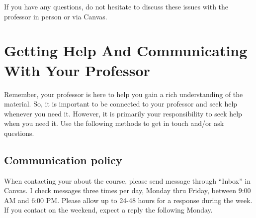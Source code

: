 \documentclass[11pt,]{article}
\begin{document}
If you have any questions, do not hesitate to discuss these issues with
the professor in person or via Canvas.

\hypertarget{getting-help-and-communicating-with-your-professor}{%
\section{Getting Help And Communicating With Your
Professor}\label{getting-help-and-communicating-with-your-professor}}

Remember, your professor is here to help you gain a rich understanding
of the material. So, it is important to be connected to your professor
and seek help whenever you need it. However, it is primarily your
responsibility to seek help when you need it. Use the following methods
to get in touch and/or ask questions.

\hypertarget{communication-policy}{%
\subsection{Communication policy}\label{communication-policy}}

When contacting your about the course, please send message through
``Inbox'' in Canvas. I check messages three times per day, Monday thru
Friday, between 9:00 AM and 6:00 PM. Please allow up to 24-48 hours for
a response during the week. If you contact on the weekend, expect a
reply the following Monday.
\end{document}
